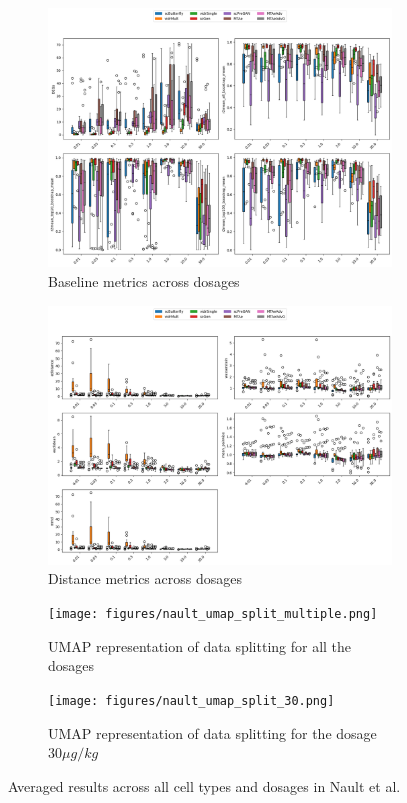 \documentclass[12pt, a4paper]{article}
\begin{document}
\begin{figure}[h!]
    \begin{subfigure}[b]{0.48\textwidth}
        \centering
        \includegraphics[width=\textwidth]{selected_benchmarking_doses_baseline_metrics_nault.png}
        \caption{Baseline metrics across dosages}
        \label{}
    \end{subfigure}
    \begin{subfigure}[b]{0.48\textwidth}
        \centering
        \includegraphics[width=.9\textwidth]{selected_benchmarking_doses_distance_metrics_nault.png}
        \caption{Distance metrics across dosages}
        \label{}
    \end{subfigure}
    \begin{subfigure}[b]{0.48\textwidth}
        \centering
        \texttt{[image: figures/nault\_umap\_split\_multiple.png]}
        \caption{UMAP representation of data splitting for all the dosages}
        \label{}
    \end{subfigure}
    \begin{subfigure}[b]{0.48\textwidth}
        \centering
        \texttt{[image: figures/nault\_umap\_split\_30.png]}
        \caption{UMAP representation of data splitting for the dosage $30 \mu g/kg$}
        \label{}
    \end{subfigure}       
    \caption{Averaged results across all cell types and dosages in Nault et al. \cite{nault2021single,nault2022benchmarking}}
    \label{fig:eval_nault}
\end{figure}
\end{document}

